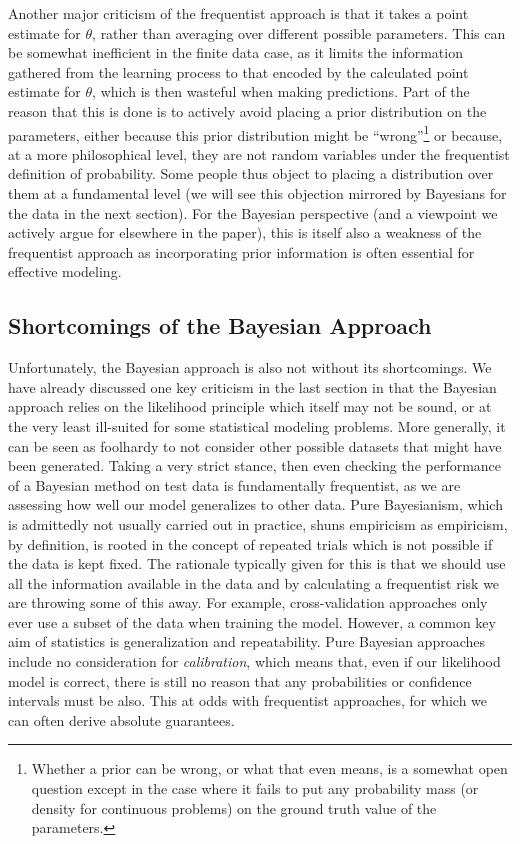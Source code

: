 Another major criticism of the frequentist approach is that it takes a point estimate for $\theta$, rather than averaging
over different possible parameters.  This can be somewhat inefficient in the finite data case, as it limits the information
gathered from the learning process to that encoded by the calculated point estimate for $\theta$, which is then wasteful
when making predictions.  Part of the reason that this
is done is to actively avoid placing a prior distribution on the parameters, either because this prior distribution might
be ``wrong''\footnote{Whether a prior can be wrong, or what that even means, is a somewhat open question except in the
	case where it fails to put any probability mass (or density for continuous problems) on the ground truth value of
	the parameters.} or because, at a more philosophical level, they are not random variables under the frequentist definition
of probability.  Some people thus object to placing a distribution over them at a fundamental level (we will see this objection
mirrored by Bayesians for the data in the next section).  For the Bayesian perspective (and a viewpoint we actively 
argue for elsewhere in the paper), this is itself also a weakness of the frequentist approach as incorporating prior
information is often essential for effective modeling.


\subsection{Shortcomings of the Bayesian Approach}
\label{sec:bayes:religion:bayes}

Unfortunately, the Bayesian approach is also not without its shortcomings.  We have already discussed one
key criticism in the last section in that the Bayesian approach relies on the likelihood principle which itself may not
be sound, or at the very least ill-suited for some statistical modeling problems.  More generally, it can be seen as
foolhardy to not consider other possible datasets that might have been generated.  Taking a very strict stance, then
even checking the performance of a Bayesian method on test data is fundamentally frequentist, as we are assessing how
well our model generalizes to other data.  Pure Bayesianism, which is admittedly not usually carried out in practice, shuns
empiricism as empiricism, by definition, is rooted in the concept of repeated trials which is not possible if the data is kept fixed.
The rationale typically given for
this is that we should use all the information available in the data and by calculating a frequentist risk we are throwing
some of this away.  For example, cross-validation approaches only ever use a subset of the data when training the model.
However, a common key aim of statistics is generalization and repeatability.  Pure Bayesian approaches include no
consideration for \emph{calibration}, which means that, even if our likelihood model is correct, there is still no reason
that any probabilities or confidence intervals must be also.  This at odds with frequentist approaches, for which
we can often derive absolute guarantees.

